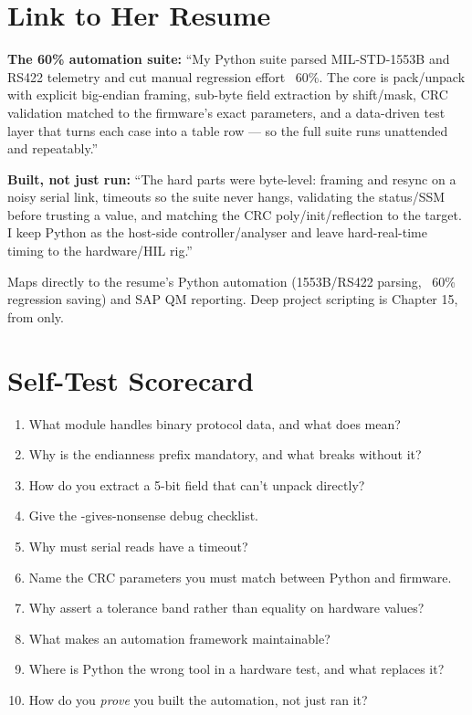 \section{Link to Her Resume}
\begin{resumelink}
\textbf{The 60\% automation suite:} ``My Python suite parsed MIL-STD-1553B and
RS422 telemetry and cut manual regression effort ~60\%. The core is
 pack/unpack with explicit big-endian framing, sub-byte field
extraction by shift/mask, CRC validation matched to the firmware's exact
parameters, and a data-driven test layer that turns each case into a table row
--- so the full suite runs unattended and repeatably.''

\medskip
\textbf{Built, not just run:} ``The hard parts were byte-level: framing and
resync on a noisy serial link, timeouts so the suite never hangs, validating the
status/SSM before trusting a value, and matching the CRC poly/init/reflection to
the target. I keep Python as the host-side controller/analyser and leave
hard-real-time timing to the hardware/HIL rig.''

\medskip
\small Maps directly to the resume's Python automation (1553B/RS422 parsing,
~60\% regression saving) and SAP QM reporting. Deep project scripting is
Chapter 15, from  only.
\end{resumelink}

\section{Self-Test Scorecard}
\begin{scorecard}
\begin{enumerate}
\item What module handles binary protocol data, and what does  mean?
\item Why is the endianness prefix mandatory, and what breaks without it?
\item How do you extract a 5-bit field that  can't unpack directly?
\item Give the -gives-nonsense debug checklist.
\item Why must serial reads have a timeout?
\item Name the CRC parameters you must match between Python and firmware.
\item Why assert a tolerance band rather than equality on hardware values?
\item What makes an automation framework maintainable?
\item Where is Python the wrong tool in a hardware test, and what replaces it?
\item How do you \emph{prove} you built the automation, not just ran it?
\end{enumerate}
\end{scorecard}

